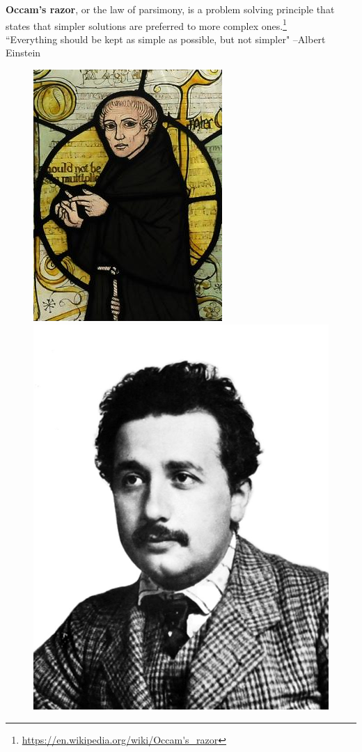 \documentclass[10pt]{beamer}
\begin{document}
\begin{frame}
\textbf{Occam's razor}, or the law of parsimony, is a problem solving principle that states that simpler solutions are preferred to more complex ones.\footnote{\url{https://en.wikipedia.org/wiki/Occam's_razor}}\\
\vspace{15pt}
``Everything should be kept as simple as possible, but not simpler" --Albert Einstein

\begin{figure}
\includegraphics[scale=0.3]{figure/ockham.png}
\hspace{2cm}
\includegraphics[scale=0.15]{figure/einstein.jpg}
\end{figure}
\end{frame}
\end{document}
